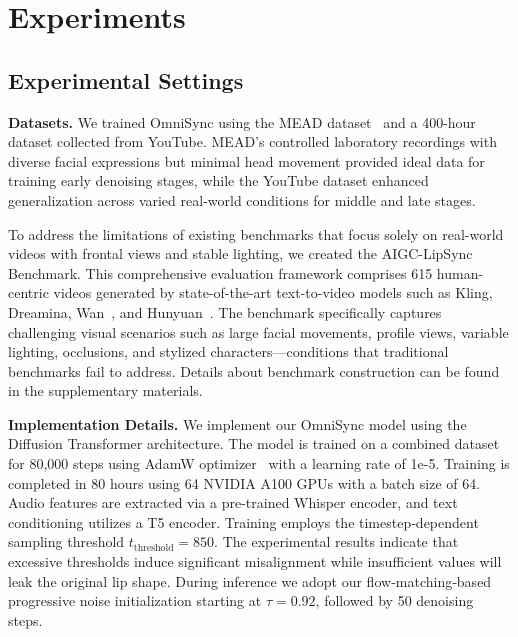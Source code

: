 \vspace{-1em}
\section{Experiments}
\vspace{-0.5em}
\subsection{Experimental Settings}

\textbf{Datasets.} We trained OmniSync using the MEAD dataset~\cite{wang2020mead} and a 400-hour dataset collected from YouTube. MEAD's controlled laboratory recordings with diverse facial expressions but minimal head movement provided ideal data for training early denoising stages, while the YouTube dataset enhanced generalization across varied real-world conditions for middle and late stages.

To address the limitations of existing benchmarks that focus solely on real-world videos with frontal views and stable lighting, we created the AIGC-LipSync Benchmark. This comprehensive evaluation framework comprises 615 human-centric videos generated by state-of-the-art text-to-video models such as Kling, Dreamina, Wan~\cite{wang2025wan}, and Hunyuan~\cite{kong2024hunyuanvideo}. The benchmark specifically captures challenging visual scenarios such as large facial movements, profile views, variable lighting, occlusions, and stylized characters—conditions that traditional benchmarks fail to address. Details about benchmark construction can be found in the supplementary materials.

\textbf{Implementation Details.} We implement our OmniSync model using the Diffusion Transformer architecture. The model is trained on a combined dataset for 80,000 steps using AdamW optimizer~\cite{loshchilov2017decoupled} with a learning rate of 1e-5. Training is completed in 80 hours using 64 NVIDIA A100 GPUs with a batch size of 64. Audio features are extracted via a pre-trained Whisper encoder, and text conditioning utilizes a T5 encoder. Training employs the timestep‑dependent sampling threshold $t_{\text{threshold}}= 850$. The experimental results indicate that excessive thresholds induce significant misalignment while insufficient values will leak the original lip shape.
During inference we adopt our flow‑matching‑based progressive noise initialization starting at $\tau = 0.92$,  followed by 50 denoising steps.




